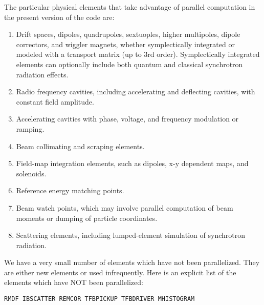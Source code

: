 \documentclass[11pt]{article}
\begin{document}
The particular physical elements that take advantage of parallel computation in the present version of the code are:
\begin{enumerate}

\item Drift spaces, dipoles, quadrupoles, sextuoples, higher
multipoles, dipole correctors, and wiggler magnets, whether
symplectically integrated or modeled with a transport matrix (up to
3rd order).  Symplectically integrated elements can optionally include
both quantum and classical synchrotron radiation effects.

\item Radio frequency cavities, including accelerating and deflecting cavities, with constant field amplitude.

\item Accelerating cavities with phase, voltage, and frequency modulation or ramping.

\item Beam collimating and scraping elements.

\item Field-map integration elements, such as dipoles, x-y dependent maps, and solenoids.

\item Reference energy matching points.

\item Beam watch points, which may involve parallel computation of beam moments or dumping of particle coordinates.

\item Scattering elements, including lumped-element simulation of synchrotron radiation.\\
\end{enumerate}


\noindent 
We have a very small number of elements which have not been parallelized. They are either new elements or used infrequently. Here is an explicit list of the elements which have NOT been parallelized:
\begin{verbatim}
RMDF IBSCATTER REMCOR TFBPICKUP TFBDRIVER MHISTOGRAM
\end{verbatim}
\end{document}
